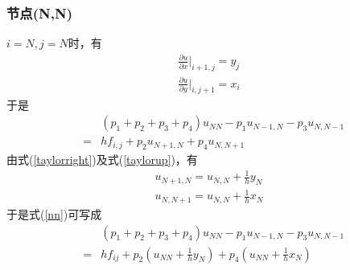 \documentclass[a4paper,left=2.5cm,right=2.5cm]{article}
\begin{document}
\begin{spacing}{1.6}
	\subsubsection{节点(N,N)}
	$i=N,j=N$时，有
	\begin{eqnarray}
	\frac{\partial u}{\partial x} \big|_{i+1,j} = y_j\\
	\frac{\partial u}{\partial y} \big|_{i,j+1} = x_i
	\end{eqnarray}
	于是
	\begin{eqnarray}
	&&(p_1+p_2+p_3+p_4)u_{NN} - p_1u_{N-1,N} - p_3u_{N,N-1}\label{nn}\\ &=&hf_{i,j}+p_2u_{N+1,N} + p_4u_{N,N+1}
	\end{eqnarray}
	由式(\ref{taylorright})及式(\ref{taylorup})，有
	\begin{eqnarray}
	u_{N+1,N} = u_{N,N} + \frac{1}{h}y_N\\
	u_{N,N+1} = u_{N,N} + \frac{1}{h}x_N
	\end{eqnarray}
	于是式(\ref{nn})可写成
	\begin{eqnarray}
	&&(p_1+p_2+p_3+p_4)u_{NN} - p_1u_{N-1,N} - p_3u_{N,N-1}\label{nn}\\
	&=&hf_{ij} +p_2(u_{NN}+\frac{1}{h}y_N)+p_4(u_{NN}+\frac{1}{h}x_N)
	\end{eqnarray}

\end{spacing}
\end{document}
